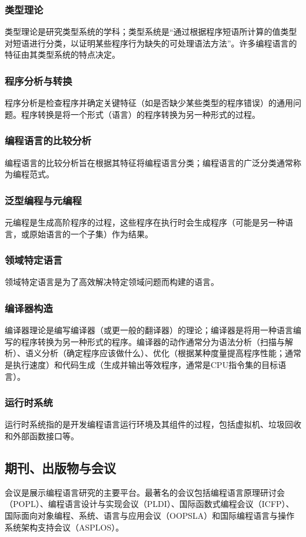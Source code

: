 \subsubsection{类型理论} 
类型理论是研究类型系统的学科；类型系统是“通过根据程序短语所计算的值类型对短语进行分类，以证明某些程序行为缺失的可处理语法方法”。许多编程语言的特征由其类型系统的特点决定。
\subsubsection{程序分析与转换}  
程序分析是检查程序并确定关键特征（如是否缺少某些类型的程序错误）的通用问题。程序转换是将一个形式（语言）的程序转换为另一种形式的过程。
\subsubsection{编程语言的比较分析} 
编程语言的比较分析旨在根据其特征将编程语言分类；编程语言的广泛分类通常称为编程范式。
\subsubsection{泛型编程与元编程} 
元编程是生成高阶程序的过程，这些程序在执行时会生成程序（可能是另一种语言，或原始语言的一个子集）作为结果。
\subsubsection{领域特定语言}  
领域特定语言是为了高效解决特定领域问题而构建的语言。
\subsubsection{编译器构造}    
编译器理论是编写编译器（或更一般的翻译器）的理论；编译器是将用一种语言编写的程序转换为另一种形式的程序。编译器的动作通常分为语法分析（扫描与解析）、语义分析（确定程序应该做什么）、优化（根据某种度量提高程序性能；通常是执行速度）和代码生成（生成并输出等效程序，通常是CPU指令集的目标语言）。
\subsubsection{运行时系统}  
运行时系统指的是开发编程语言运行环境及其组件的过程，包括虚拟机、垃圾回收和外部函数接口等。
\subsection{期刊、出版物与会议}  
会议是展示编程语言研究的主要平台。最著名的会议包括编程语言原理研讨会（POPL）、编程语言设计与实现会议（PLDI）、国际函数式编程会议（ICFP）、国际面向对象编程、系统、语言与应用会议（OOPSLA）和国际编程语言与操作系统架构支持会议（ASPLOS）。

